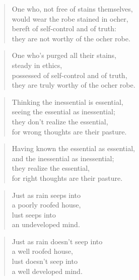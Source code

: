 \documentclass[12pt,openany]{book}%
\begin{document}
\begin{verse}%
One who, not free of stains themselves, \\
would wear the robe stained in ocher, \\
bereft of self-control and of truth: \\
they are not worthy of the ocher robe. 

%
\end{verse}

\begin{verse}%
One who’s purged all their stains, \\
steady in ethics, \\
possessed of self-control and of truth, \\
they are truly worthy of the ocher robe. 

%
\end{verse}

\begin{verse}%
Thinking the inessential is essential, \\
seeing the essential as inessential; \\
they don’t realize the essential, \\
for wrong thoughts are their pasture. 

%
\end{verse}

\begin{verse}%
Having known the essential as essential, \\
and the inessential as inessential; \\
they realize the essential, \\
for right thoughts are their pasture. 

%
\end{verse}

\begin{verse}%
Just as rain seeps into \\
a poorly roofed house, \\
lust seeps into \\
an undeveloped mind. 

%
\end{verse}

\begin{verse}%
Just as rain doesn’t seep into \\
a well roofed house, \\
lust doesn’t seep into \\
a well developed mind. 

%
\end{verse}
\end{document}
